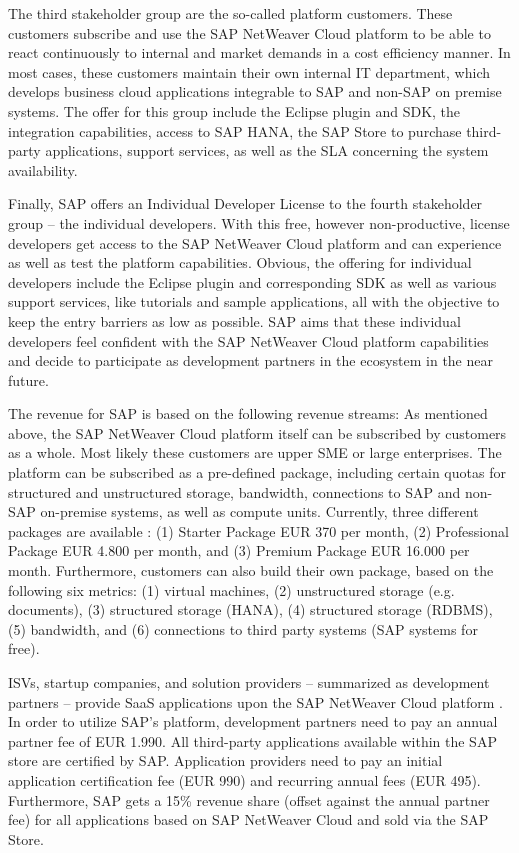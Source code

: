 The third stakeholder group are the so-called platform customers. These customers subscribe and use the SAP NetWeaver Cloud platform to be able to react continuously to internal and market demands in a cost efficiency manner. In most cases, these customers maintain their own internal IT department, which develops business cloud applications integrable to SAP and non-SAP on premise systems. The offer for this group include the Eclipse plugin and \ac{SDK}, the integration capabilities, access to SAP HANA, the SAP Store to purchase third-party applications, support services, as well as the \ac{SLA} concerning the system availability.

Finally, SAP offers an Individual Developer License to the fourth stakeholder group -- the individual developers. With this free, however non-productive, license developers get access to the SAP NetWeaver Cloud platform and can experience as well as test the platform capabilities. Obvious, the offering for individual developers include the Eclipse plugin and corresponding \ac{SDK} as well as various support services, like tutorials and sample applications, all with the objective to keep the entry barriers as low as possible. SAP aims that these individual developers feel confident with the SAP NetWeaver Cloud platform capabilities and decide to participate as development partners in the ecosystem in the near future.

The revenue for SAP is based on the following revenue streams: As mentioned above, the SAP NetWeaver Cloud platform itself can be subscribed by customers as a whole. Most likely these customers are upper \ac{SME} or large enterprises. The platform can be subscribed as a pre-defined package, including certain quotas for structured and unstructured storage, bandwidth, connections to SAP and non-SAP on-premise systems, as well as compute units. Currently, three different packages are available \citep{SAP2013b}: (1) Starter Package EUR 370 per month, (2) Professional Package EUR 4.800 per month, and (3) Premium Package EUR 16.000 per month. Furthermore, customers can also build their own package, based on the following six metrics: (1) virtual machines, (2) unstructured storage (e.g. documents), (3) structured storage (HANA), (4) structured storage (RDBMS), (5) bandwidth, and (6) connections to third party systems (SAP systems for free). 

\acp{ISV}, startup companies, and solution providers -- summarized as development partners -- provide \ac{SaaS} applications upon the SAP NetWeaver Cloud platform \citep{SAP2013a}. In order to utilize SAP's platform, development partners need to pay an annual partner fee of EUR 1.990. All third-party applications available within the SAP store are certified by SAP. Application providers need to pay an initial application certification fee (EUR 990) and recurring annual fees (EUR 495). Furthermore, SAP gets a 15\% revenue share (offset against the annual partner fee) for all applications based on SAP NetWeaver Cloud and sold via the SAP Store.

